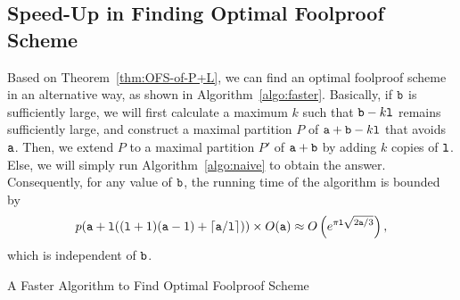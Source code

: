 \subsection{Speed-Up in Finding Optimal Foolproof Scheme}
Based on Theorem~\ref{thm:OFS-of-P+L}, we can find an optimal foolproof scheme in an alternative way, as shown in Algorithm~\ref{algo:faster}.  
Basically, if $\mathtt{b}$ is sufficiently large, we will first calculate a maximum $k$ such that $\mathtt{b} - k\mathtt{l}$ remains sufficiently large, 
and construct a maximal partition $P$ of $\mathtt{a} + \mathtt{b} - k\mathtt{l}$ that avoids $\mathtt{a}$. 
Then, we extend $P$ to a maximal partition $P'$ of $\mathtt{a} + \mathtt{b}$ by adding $k$ copies of $\mathtt{l}$.  Else, we will simply run Algorithm~\ref{algo:naive}
to obtain the answer.  Consequently, for any value of $\mathtt{b}$, the running time of the algorithm is bounded by 
$$p(\mathtt{a} + \mathtt{l}((\mathtt{l}+1)(\mathtt{a}-1) + \left \lceil \mathtt{a}/\mathtt{l} \right \rceil)) \times O(\mathtt{a}) \approx O\left(e^{\pi\mathtt{l}\sqrt{2\mathtt{a}/3}}\right),$$  
which is independent of $\mathtt{b}$.

\begin{algorithm}
\caption{A Faster Algorithm to Find Optimal Foolproof Scheme}\label{algo:faster}
\begin{algorithmic}
    \Else
    \EndIf
  \EndProcedure
\end{algorithmic}
\end{algorithm}

